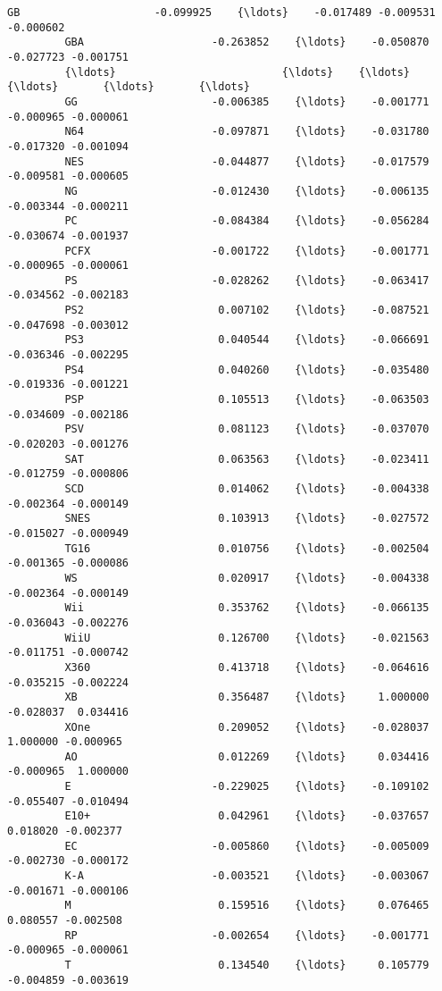 \documentclass[11pt]{article}
\begin{document}
\begin{Verbatim}[commandchars=\\\{\}]
         GB                     -0.099925    {\ldots}    -0.017489 -0.009531 -0.000602   
         GBA                    -0.263852    {\ldots}    -0.050870 -0.027723 -0.001751   
         {\ldots}                          {\ldots}    {\ldots}          {\ldots}       {\ldots}       {\ldots}   
         GG                     -0.006385    {\ldots}    -0.001771 -0.000965 -0.000061   
         N64                    -0.097871    {\ldots}    -0.031780 -0.017320 -0.001094   
         NES                    -0.044877    {\ldots}    -0.017579 -0.009581 -0.000605   
         NG                     -0.012430    {\ldots}    -0.006135 -0.003344 -0.000211   
         PC                     -0.084384    {\ldots}    -0.056284 -0.030674 -0.001937   
         PCFX                   -0.001722    {\ldots}    -0.001771 -0.000965 -0.000061   
         PS                     -0.028262    {\ldots}    -0.063417 -0.034562 -0.002183   
         PS2                     0.007102    {\ldots}    -0.087521 -0.047698 -0.003012   
         PS3                     0.040544    {\ldots}    -0.066691 -0.036346 -0.002295   
         PS4                     0.040260    {\ldots}    -0.035480 -0.019336 -0.001221   
         PSP                     0.105513    {\ldots}    -0.063503 -0.034609 -0.002186   
         PSV                     0.081123    {\ldots}    -0.037070 -0.020203 -0.001276   
         SAT                     0.063563    {\ldots}    -0.023411 -0.012759 -0.000806   
         SCD                     0.014062    {\ldots}    -0.004338 -0.002364 -0.000149   
         SNES                    0.103913    {\ldots}    -0.027572 -0.015027 -0.000949   
         TG16                    0.010756    {\ldots}    -0.002504 -0.001365 -0.000086   
         WS                      0.020917    {\ldots}    -0.004338 -0.002364 -0.000149   
         Wii                     0.353762    {\ldots}    -0.066135 -0.036043 -0.002276   
         WiiU                    0.126700    {\ldots}    -0.021563 -0.011751 -0.000742   
         X360                    0.413718    {\ldots}    -0.064616 -0.035215 -0.002224   
         XB                      0.356487    {\ldots}     1.000000 -0.028037  0.034416   
         XOne                    0.209052    {\ldots}    -0.028037  1.000000 -0.000965   
         AO                      0.012269    {\ldots}     0.034416 -0.000965  1.000000   
         E                      -0.229025    {\ldots}    -0.109102 -0.055407 -0.010494   
         E10+                    0.042961    {\ldots}    -0.037657  0.018020 -0.002377   
         EC                     -0.005860    {\ldots}    -0.005009 -0.002730 -0.000172   
         K-A                    -0.003521    {\ldots}    -0.003067 -0.001671 -0.000106   
         M                       0.159516    {\ldots}     0.076465  0.080557 -0.002508   
         RP                     -0.002654    {\ldots}    -0.001771 -0.000965 -0.000061   
         T                       0.134540    {\ldots}     0.105779 -0.004859 -0.003619   
         

\end{Verbatim}
\end{document}
